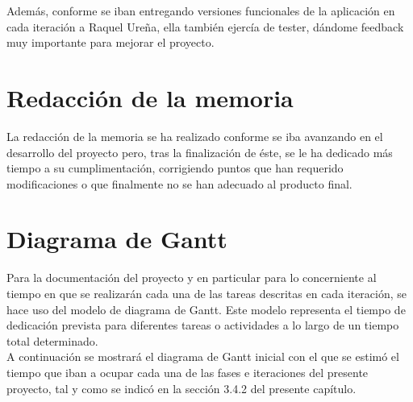 Además, conforme se iban entregando versiones funcionales de la aplicación en cada iteración a Raquel Ureña, ella también ejercía de tester, dándome feedback muy importante para mejorar el proyecto.

\section{Redacción de la memoria}

La redacción de la memoria se ha realizado conforme se iba avanzando en el desarrollo del proyecto pero, tras la finalización de éste, se le ha dedicado más tiempo a su cumplimentación, corrigiendo puntos que han requerido modificaciones o que finalmente no se han adecuado al producto final.

\section{Diagrama de Gantt}

Para la documentación del proyecto y en particular para lo concerniente al tiempo en que se realizarán cada una de las tareas descritas en cada iteración, se hace uso del modelo de diagrama de Gantt. Este modelo representa el tiempo de dedicación prevista para diferentes tareas o actividades a lo largo de un tiempo total determinado.\\

A continuación se mostrará el diagrama de Gantt inicial con el que se estimó el tiempo que iban a ocupar cada una de las fases e iteraciones del presente proyecto, tal y como se indicó en la sección 3.4.2 del presente capítulo.









